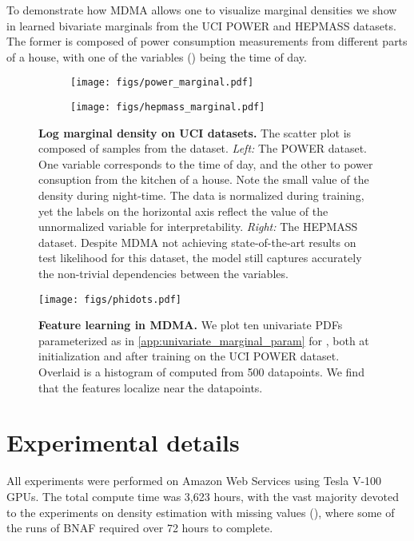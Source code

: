 \documentclass{article}
\begin{document}
To demonstrate how MDMA allows one to visualize marginal densities
we show in  learned bivariate marginals from the 
UCI POWER and HEPMASS datasets. The former is composed of power consumption measurements from different parts of a house, with one of the variables () being the time of day. 
\begin{figure}
    \centering
        \begin{subfigure}[c]{0.45\textwidth}
      \texttt{[image: figs/power\_marginal.pdf]}
      \label{}
    \end{subfigure}
    \begin{subfigure}[c]{0.45\textwidth}
    \vspace{0.13in}
      \texttt{[image: figs/hepmass\_marginal.pdf]}
      \label{}
    \end{subfigure}
\caption{\textbf{Log marginal density on UCI datasets.} The scatter plot is composed of  samples from the dataset. \textit{Left:} The POWER dataset. One variable corresponds to the time of day, and the other to power consuption from the kitchen of a house. Note the small value of the density during night-time. The data is normalized during training, yet the labels on the horizontal axis reflect the value of the unnormalized variable for interpretability. \textit{Right:} The HEPMASS dataset. Despite MDMA not achieving state-of-the-art results on test likelihood for this dataset, the model still captures accurately the non-trivial dependencies between the variables. }
    \label{fig:power_marginal}
\end{figure}

\begin{figure}
    \centering
    \texttt{[image: figs/phidots.pdf]}
    \caption{\textbf{Feature learning in MDMA.} We plot ten univariate PDFs  parameterized as in \cref{app:univariate_marginal_param} for , both at initialization and after training on the UCI POWER dataset. Overlaid is a histogram of computed from 500 datapoints. We find that the features localize near the datapoints.}
    \label{fig:phidots}
\end{figure}

\section{Experimental details} \label{app:exp_details}

All experiments were performed on Amazon Web Services using Tesla V-100 GPUs. The total compute time was 3,623 hours, with the vast majority devoted to the experiments on density estimation with missing values (), where some of the runs of BNAF required over 72 hours to complete. 
\end{document}
